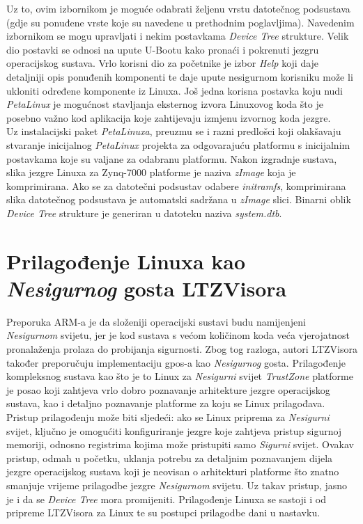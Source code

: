 \documentclass[times, utf8, diplomski, numeric]{fer}
\begin{document}
Uz to, ovim izbornikom je moguće odabrati željenu vrstu datotečnog podsustava (gdje su ponuđene vrste koje su navedene u
prethodnim poglavljima). Navedenim izbornikom se mogu upravljati i nekim postavkama \textit{Device Tree} strukture. Velik dio
postavki se odnosi na upute U-Bootu kako pronaći i pokrenuti jezgru operacijskog sustava. Vrlo korisni dio za početnike je
izbor \textit{Help} koji daje detaljniji opis ponuđenih komponenti te daje upute nesigurnom korisniku može li ukloniti
određene komponente iz Linuxa. Još jedna korisna postavka koju nudi \textit{PetaLinux} je mogućnost stavljanja eksternog
izvora Linuxovog koda što je posebno važno kod aplikacija koje zahtijevaju izmjenu izvornog koda jezgre.\\
Uz instalacijski paket \textit{PetaLinuxa}, preuzmu se i razni predlošci koji olakšavaju stvaranje inicijalnog
\textit{PetaLinux} projekta za odgovarajuću platformu s inicijalnim postavkama koje su valjane za odabranu platformu. Nakon
izgradnje sustava, slika jezgre Linuxa za Zynq-7000 platforme je naziva \textit{zImage} koja je komprimirana. Ako se
za datotečni podsustav odabere \textit{initramfs}, komprimirana slika datotečnog podsustava je automatski sadržana u
\textit{zImage} slici. Binarni oblik \textit{Device Tree} strukture je generiran u datoteku naziva \textit{system.dtb}.

\section{Prilagođenje Linuxa kao \textit{Nesigurnog} gosta LTZVisora}
Preporuka ARM-a je da složeniji operacijski sustavi budu namijenjeni \textit{Nesigurnom} svijetu, jer je kod sustava s većom
količinom koda veća vjerojatnost pronalaženja prolaza do probijanja sigurnosti. Zbog tog razloga, autori LTZVisora također
preporučuju implementaciju \gls{gpos}-a kao \textit{Nesigurnog} gosta. Prilagođenje kompleksnog sustava kao što je to Linux za \textit{Nesigurni}
svijet \textit{TrustZone} platforme je posao koji zahtjeva vrlo dobro poznavanje arhitekture jezgre operacijskog sustava, kao
i detaljno poznavanje platforme za koju se Linux prilagođava. Pristup prilagođenju može biti sljedeći: ako se Linux priprema
za \textit{Nesigurni} svijet, ključno je omogućiti konfiguriranje jezgre koje zahtjeva pristup sigurnoj memoriji, odnosno registrima
kojima može pristupiti samo \textit{Sigurni} svijet. Ovakav pristup, odmah u početku, uklanja potrebu za detaljnim poznavanjem
dijela jezgre operacijskog sustava koji je neovisan o arhitekturi platforme što znatno smanjuje vrijeme prilagodbe jezgre
\textit{Nesigurnom} svijetu. Uz takav pristup, jasno je i da se \textit{Device Tree} mora promijeniti. Prilagođenje Linuxa se sastoji
i od pripreme LTZVisora za Linux te su postupci prilagodbe dani u nastavku.
\end{document}
